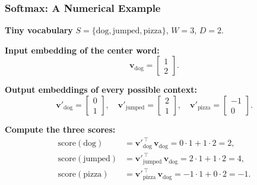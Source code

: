 \documentclass[notes,11pt, aspectratio=169]{beamer}
\newcommand{\vv}{\mathbf{v}}
\begin{document}
\begin{frame}
\frametitle{Softmax: A Numerical Example}

\textbf{Tiny vocabulary} $S = \{\text{dog}, \text{jumped}, \text{pizza}\}$, $W = 3$, $D = 2$.

\vspace{4pt}
\textbf{Input embedding of the center word:}
\[
    \vv_\text{dog} = \begin{bmatrix} 1 \\ 2 \end{bmatrix}.
\]

\vspace{4pt}
\textbf{Output embeddings of every possible context:}
\[
    \vv'_\text{dog} = \begin{bmatrix} 0 \\ 1 \end{bmatrix}, \quad
    \vv'_\text{jumped} = \begin{bmatrix} 2 \\ 1 \end{bmatrix}, \quad
    \vv'_\text{pizza} = \begin{bmatrix} -1 \\ 0 \end{bmatrix}.
\]

\vspace{6pt}
\textbf{Compute the three scores:}
\begin{align*}
    \text{score}(\text{dog}) &= \vv'^{\,\top}_\text{dog}\, \vv_\text{dog} = 0\cdot 1 + 1\cdot 2 = 2, \\
    \text{score}(\text{jumped}) &= \vv'^{\,\top}_\text{jumped}\, \vv_\text{dog} = 2\cdot 1 + 1\cdot 2 = 4, \\
    \text{score}(\text{pizza}) &= \vv'^{\,\top}_\text{pizza}\, \vv_\text{dog} = -1\cdot 1 + 0\cdot 2 = -1.
\end{align*}
\end{frame}
\end{document}
